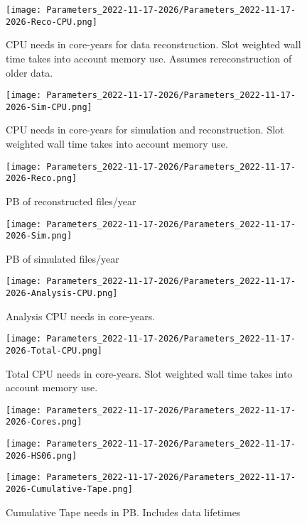 \begin{figure}[h]
\centering\texttt{[image: Parameters\_2022-11-17-2026/Parameters\_2022-11-17-2026-Reco-CPU.png]}\label{fig:Reco-CPU}
\caption{CPU needs in core-years for data reconstruction.              Slot weighted wall time takes into account memory use.  Assumes rereconstruction of older data.}
\end{figure}
\begin{figure}[h]
\centering\texttt{[image: Parameters\_2022-11-17-2026/Parameters\_2022-11-17-2026-Sim-CPU.png]}\label{fig:Sim-CPU}
\caption{CPU needs in core-years for simulation and reconstruction.              Slot weighted wall time takes into account memory use.}
\end{figure}
\begin{figure}[h]
\centering\texttt{[image: Parameters\_2022-11-17-2026/Parameters\_2022-11-17-2026-Reco.png]}\label{fig:Reco}
\caption{PB of reconstructed files/year}
\end{figure}
\begin{figure}[h]
\centering\texttt{[image: Parameters\_2022-11-17-2026/Parameters\_2022-11-17-2026-Sim.png]}\label{fig:Sim}
\caption{PB of simulated files/year}
\end{figure}
\begin{figure}[h]
\centering\texttt{[image: Parameters\_2022-11-17-2026/Parameters\_2022-11-17-2026-Analysis-CPU.png]}\label{fig:Analysis-CPU}
\caption{Analysis CPU needs in core-years.}
\end{figure}
\begin{figure}[h]
\centering\texttt{[image: Parameters\_2022-11-17-2026/Parameters\_2022-11-17-2026-Total-CPU.png]}\label{fig:Total-CPU}
\caption{Total CPU needs in core-years. Slot weighted wall time takes into account memory use.}
\end{figure}
\begin{figure}[h]
\centering\texttt{[image: Parameters\_2022-11-17-2026/Parameters\_2022-11-17-2026-Cores.png]}\label{fig:Cores}
\caption{}
\end{figure}
\begin{figure}[h]
\centering\texttt{[image: Parameters\_2022-11-17-2026/Parameters\_2022-11-17-2026-HS06.png]}\label{fig:HS06}
\caption{}
\end{figure}
\begin{figure}[h]
\centering\texttt{[image: Parameters\_2022-11-17-2026/Parameters\_2022-11-17-2026-Cumulative-Tape.png]}\label{fig:Cumulative-Tape}
\caption{Cumulative Tape needs in PB. Includes data lifetimes}
\end{figure}
